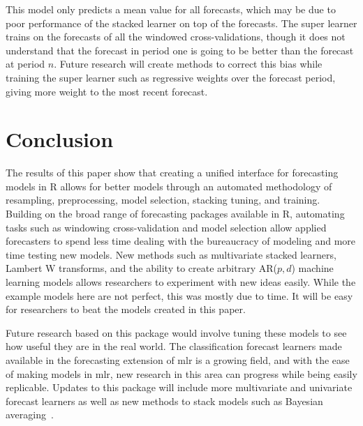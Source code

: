 \documentclass[12pt]{article}\usepackage[]{graphicx}\usepackage[]{color}
\theoremstyle{definition}
\let\proglang=\textsf
\newcommand{\pkg}[1]{{\fontseries{b}\selectfont #1}}
\begin{document}
This model only predicts a mean value for all forecasts, which may be due to poor performance of the stacked learner on top of the forecasts. The super learner trains on the forecasts of all the windowed cross-validations, though it does not understand that the forecast in period one is going to be better than the forecast at period $n$. Future research will create methods to correct this bias while training the super learner such as regressive weights over the forecast period, giving more weight to the most recent forecast.

\section{Conclusion}

The results of this paper show that creating a unified interface for forecasting models in \proglang{R} allows for better models through an automated methodology of resampling, preprocessing, model selection, stacking tuning, and training. Building on the broad range of forecasting packages available in \proglang{R}, automating tasks such as windowing cross-validation and model selection allow applied forecasters to spend less time dealing with the bureaucracy of modeling and more time testing new models. New methods such as multivariate stacked learners, Lambert W transforms, and the ability to create arbitrary AR($p,d$) machine learning models allows researchers to experiment with new ideas easily. While the example models here are not perfect, this was mostly due to time. It will be easy for researchers to beat the models created in this paper.

Future research based on this package would involve tuning these models to see how useful they are in the real world. The classification forecast learners made available in the forecasting extension of \pkg{mlr} is a growing field, and with the ease of making models in \pkg{mlr}, new research in this area can progress while being easily replicable. Updates to this package will include more multivariate and univariate forecast learners as well as new methods to stack models such as Bayesian averaging~\cite{bayesianAverage}.

{}

\end{document}
